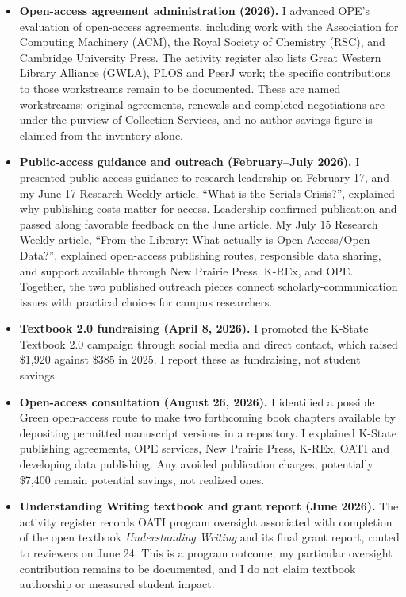 \begin{itemize}
\item \textbf{Open-access agreement administration (2026).} I advanced OPE's evaluation of open-access agreements, including work with the Association for Computing Machinery (ACM), the Royal Society of Chemistry (RSC), and Cambridge University Press. The activity register also lists Great Western Library Alliance (GWLA), PLOS and PeerJ work; the specific contributions to those workstreams remain to be documented. These are named workstreams; original agreements, renewals and completed negotiations are under the purview of Collection Services, and no author-savings figure is claimed from the inventory alone.
\item \textbf{Public-access guidance and outreach (February--July 2026).} I presented public-access guidance to research leadership on February 17, and my June 17 Research Weekly article, ``What is the Serials Crisis?'', explained why publishing costs matter for access. Leadership confirmed publication and passed along favorable feedback on the June article. My July 15 Research Weekly article, ``From the Library: What actually is Open Access/Open Data?'', explained open-access publishing routes, responsible data sharing, and support available through New Prairie Press, K-REx, and OPE. Together, the two published outreach pieces connect scholarly-communication issues with practical choices for campus researchers.
\item \textbf{Textbook 2.0 fundraising (April 8, 2026).} I promoted the K-State Textbook 2.0 campaign through social media and direct contact, which raised \$1,920 against \$385 in 2025. I report these as fundraising, not student savings.
\item \textbf{Open-access consultation (August 26, 2026).} I identified a possible Green open-access route to make two forthcoming book chapters available by depositing permitted manuscript versions in a repository. I explained K-State publishing agreements, OPE services, New Prairie Press, K-REx, OATI and developing data publishing. Any avoided publication charges, potentially \$7,400 remain potential savings, not realized ones.
\item \textbf{Understanding Writing textbook and grant report (June 2026).} The activity register records OATI program oversight associated with completion of the open textbook \textit{Understanding Writing} and its final grant report, routed to reviewers on June 24. This is a program outcome; my particular oversight contribution remains to be documented, and I do not claim textbook authorship or measured student impact.

\end{itemize}

